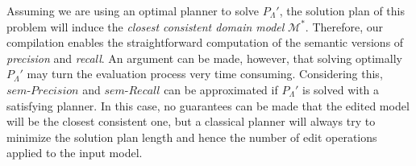 Assuming we are using an optimal planner to solve $P_{\Lambda}'$, the solution plan of this problem will induce the \emph{closest consistent domain model} $\mathcal{M^*}$. Therefore, our compilation enables the straightforward computation of the semantic versions of \emph{precision} and \emph{recall}. An argument can be made, however, that solving optimally $P_{\Lambda}'$ may turn the evaluation process very time consuming. Considering this, $sem\text{-}Precision$ and $sem\text{-}Recall$ can be approximated if $P_{\Lambda}'$ is solved with a satisfying planner. In this case, no guarantees can be made that the edited model will be the closest consistent one, but a classical planner will always try to minimize the solution plan length and hence the number of edit operations applied to the input model.















